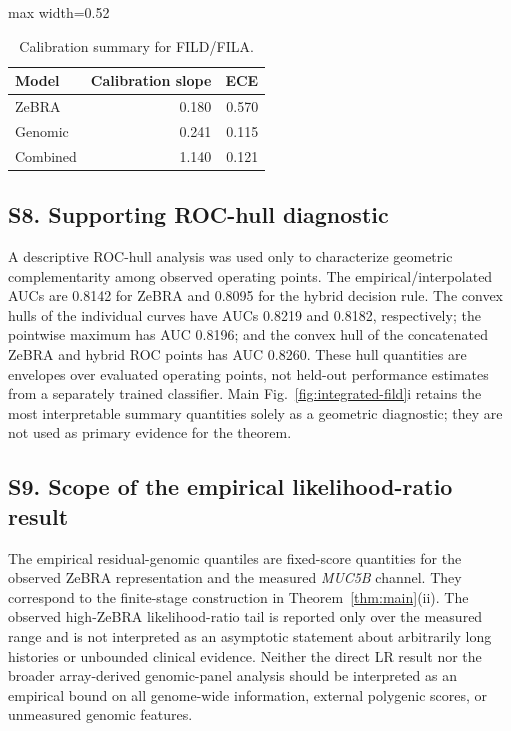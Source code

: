 \begin{table}[!t]
\caption{Calibration summary for FILD/FILA.}
\label{tab:supp-calibration}
\centering\small
\setlength{\tabcolsep}{4pt}
\renewcommand{\arraystretch}{1.04}
\begin{adjustbox}{max width=0.52\textwidth}
\begin{tabular}{lrr}
\toprule
Model & Calibration slope & ECE\\
\midrule
ZeBRA & 0.180 & 0.570\\
Genomic & 0.241 & 0.115\\
Combined & 1.140 & 0.121\\
\bottomrule
\end{tabular}
\end{adjustbox}
\end{table}

\subsection*{S8. Supporting ROC-hull diagnostic}
A descriptive ROC-hull analysis was used only to characterize geometric complementarity among observed operating points. The empirical/interpolated AUCs are 0.8142 for ZeBRA and 0.8095 for the hybrid decision rule. The convex hulls of the individual curves have AUCs 0.8219 and 0.8182, respectively; the pointwise maximum has AUC 0.8196; and the convex hull of the concatenated ZeBRA and hybrid ROC points has AUC 0.8260. These hull quantities are envelopes over evaluated operating points, not held-out performance estimates from a separately trained classifier. Main Fig.~\ref{fig:integrated-fild}i retains the most interpretable summary quantities solely as a geometric diagnostic; they are not used as primary evidence for the theorem.

\subsection*{S9. Scope of the empirical likelihood-ratio result}
The empirical residual-genomic quantiles are fixed-score quantities for the observed ZeBRA representation and the measured \textit{MUC5B} channel. They correspond to the finite-stage construction in Theorem~\ref{thm:main}(ii). The observed high-ZeBRA likelihood-ratio tail is reported only over the measured range and is not interpreted as an asymptotic statement about arbitrarily long histories or unbounded clinical evidence. Neither the direct LR result nor the broader array-derived genomic-panel analysis should be interpreted as an empirical bound on all genome-wide information, external polygenic scores, or unmeasured genomic features.

